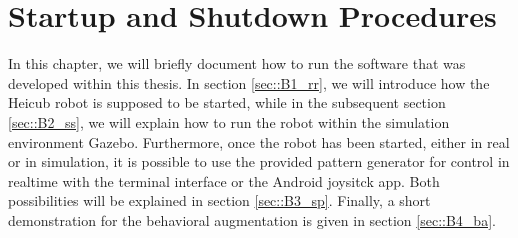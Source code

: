 \chapter{Startup and Shutdown Procedures}
\label{sec::B_su}
In this chapter, we will briefly document how to run the software that was developed within this thesis. In section \ref{sec::B1_rr}, we will introduce how the Heicub robot is supposed to be started, while in the subsequent section \ref{sec::B2_ss}, we will explain how to run the robot within the simulation environment Gazebo. Furthermore, once the robot has been started, either in real or in simulation, it is possible to use the provided pattern generator for control in realtime with the terminal interface or the Android joysitck app. Both possibilities will be explained in section \ref{sec::B3_sp}. Finally, a short demonstration for the behavioral augmentation is given in section \ref{sec::B4_ba}.
